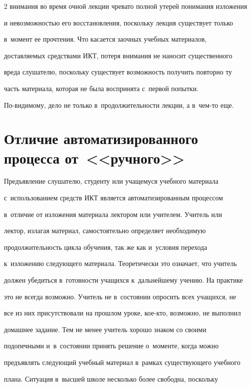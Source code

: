 \begin{multicols}{2}
внимания во время очной лекции чревато полной утерей понимания изложения 


и невозможностью его восстановления, поскольку лекция существует только 


в~момент ее прочтения. Что касается заочных учебных материалов, 


доставляемых средствами ИКТ, потеря внимания не наносит существенного 


вреда слушателю, поскольку существует возможность получить повторно ту 


часть материала, которая не была воспринята с~первой попытки.  


По-ви\-ди\-мо\-му, дело не только в~продолжительности лекции, а в~чем-то еще.


  


\section{Отличие автоматизированного процесса от~<<ручного>>}





  Предъявление слушателю, студенту или учащемуся учебного материала 


с~использованием средств ИКТ является автоматизированным процессом 


в~отличие от изложения материала лектором или учителем. Учитель или 


лектор, излагая материал, самостоятельно определяет необходимую 


продолжительность цикла обучения, так же как и~условия перехода 


к~изложению следующего материала. Тео\-ре\-ти\-че\-ски это означает, что учитель 


должен убедиться в~готовности учащихся к~дальнейшему учению. На практике 


это не всегда возможно. Учитель не в~состоянии опросить всех учащихся, не 


все из них присутствовали на прошлом уроке, кое-кто, возможно, не выполнил 


домашнее задание. Тем не менее учитель хорошо знаком со своими 


подопечными и~в~состоянии принять решение о~моменте, когда можно 


предъявлять следующий учебный материал в~рамках существующего учебного 


плана. Ситуация в~высшей школе несколько более свободна, поскольку 



\end{multicols}
